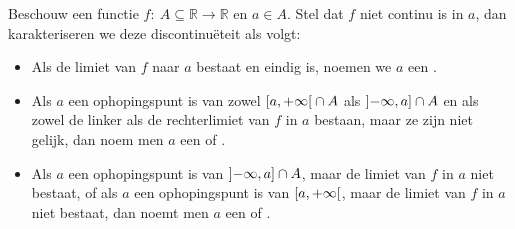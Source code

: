 \documentclass[main.tex]{subfiles}
\begin{document}
\begin{de}
  Beschouw een functie $f:\ A \subseteq \mathbb{R} \rightarrow \mathbb{R}$ en $a\in A$.
  Stel dat $f$ niet continu is in $a$, dan karakteriseren we deze discontinu\"eteit als volgt:
  \begin{itemize}
  \item Als de limiet van $f$ naar $a$ bestaat en eindig is, noemen we $a$ een .
  \item Als $a$ een ophopingspunt is van zowel $\interval[open right]{a}{+\infty} \cap A$ als $\interval[open left]{-\infty}{a} \cap A$ en als zowel de linker als de rechterlimiet van $f$ in $a$ bestaan, maar ze zijn niet gelijk, dan noem men $a$ een  of .
  \item Als $a$ een ophopingspunt is van $\interval[open left]{-\infty}{a} \cap A$, maar de limiet van $f$ in $a$ niet bestaat, of als $a$ een ophopingspunt is van $\interval[open right]{a}{+\infty}$, maar de limiet van $f$ in $a$ niet bestaat, dan noemt men $a$ een  of .
  \end{itemize}
\end{de}
\end{document}
